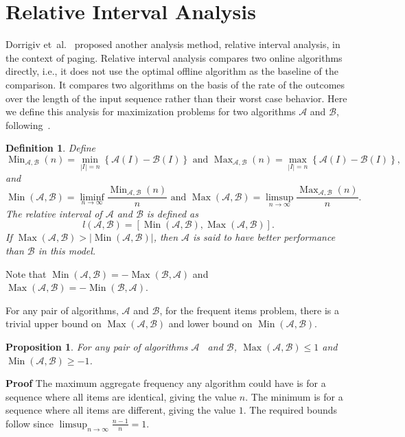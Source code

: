 \documentclass[11pt]{article}
\newtheorem{xdefinition}{Definition}
\newtheorem{xproposition}{Proposition}
\newenvironment{definition}{\begin{xdefinition}\rm}{\hspace*{\fill}\raisebox{-1pt}{\boldmath$\Box$}\end{xdefinition}}
\newenvironment{proposition}{\begin{xproposition}\rm}{\end{xproposition}}
\newenvironment{proof}{\begin{trivlist}\item[]{\bf Proof }}{\hspace*{\fill}\raisebox{-1pt}{\boldmath$\Box$}\end{trivlist}}
\newcommand{\algA}{{\ensuremath{\mathcal{A}}}\xspace}
\newcommand{\algB}{{\ensuremath{\mathcal{B}}}\xspace}
\DeclareMathOperator{\Max}{\textrm{Max}}
\DeclareMathOperator{\Min}{\textrm{Min}}
\begin{document}
\section{Relative Interval Analysis}\label{sec:realint}
Dorrigiv et~al.~\cite{Dorrigiv09} proposed another analysis method, relative interval analysis, in the context of paging.
Relative interval analysis compares two online algorithms directly, i.e., it does not use the optimal offline algorithm as the baseline of the comparison.
It compares two algorithms on the basis of the rate of the outcomes over the length of the input sequence rather than their worst case behavior.
Here we define this analysis for maximization problems for two algorithms $\mathcal{A}$ and $\mathcal{B}$, following~\cite{Dorrigiv09}.
\begin{definition}\label{def:relint}
Define
\[\Min_{\mathcal{A}, \mathcal{B}}(n) = \min_{|I| = n} \left \lbrace \mathcal{A}(I) - \mathcal{B}(I)\right\rbrace
\mbox{~and~}
\Max_{\mathcal{A}, \mathcal{B}}(n) = \max_{|I| = n} \left \lbrace \mathcal{A}(I) - \mathcal{B}(I)\right\rbrace,\]
and 
\[\Min(\mathcal{A}, \mathcal{B}) = \liminf _{n\to \infty} \frac{\Min_{\mathcal{A}, \mathcal{B}}(n)}{n} \mbox{ and } \Max(\mathcal{A}, \mathcal{B}) = \limsup _{n\to \infty} \frac{\Max_{\mathcal{A}, \mathcal{B}}(n)}{n}.\]
The {\em relative interval} of $\mathcal{A}$ and $\mathcal{B}$ is defined as
$$l(\mathcal{A}, \mathcal{B}) = \left[ \Min(\mathcal{A}, \mathcal{B}), \Max(\mathcal{A}, \mathcal{B}) \right].$$
If $\Max(\mathcal{A}, \mathcal{B}) > |\Min(\mathcal{A}, \mathcal{B})| $, then $\mathcal{A}$ is said to have {\em better performance} than $\mathcal{B}$ in this model.
\end{definition}
Note that $\Min(\mathcal{A}, \mathcal{B}) = - \Max(\mathcal{B}, \mathcal{A})$ and $\Max(\mathcal{A}, \mathcal{B}) = -\Min(\mathcal{B}, \mathcal{A})$.

For any pair of algorithms, \algA and \algB, for the frequent items
problem, there is a trivial upper bound on $\Max(\algA,\algB)$ and
lower bound on $\Min(\algA,\algB)$.
\begin{proposition}\label{trivialMax}
For any pair of algorithms \algA~ and \algB, $\Max(\algA,\algB)\leq 1$
and $\Min(\algA,\algB)\geq -1$.
\end{proposition}
\begin{proof}
The maximum aggregate frequency any algorithm could
have is for a sequence where all items are identical, giving the value $n$.
The minimum is for a sequence where all items are different, giving the
value $1$. The required bounds follow since $\limsup_{n\rightarrow\infty} \frac{n-1}{n} = 1$.
\end{proof}
\end{document}
